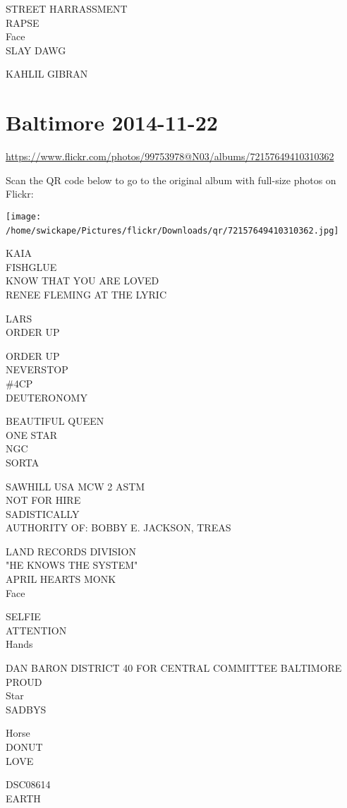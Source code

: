 \documentclass[10pt,letterpaper]{article}
\begin{document}
STREET HARRASSMENT\\
RAPSE\\
Face\\
SLAY DAWG

KAHLIL GIBRAN
\

\section*{Baltimore 2014-11-22}

\url{https://www.flickr.com/photos/99753978@N03/albums/72157649410310362}

Scan the QR code below to go to the original album with full-size photos on Flickr:

\texttt{[image: /home/swickape/Pictures/flickr/Downloads/qr/72157649410310362.jpg]}
\

KAIA\\
FISHGLUE\\
KNOW THAT YOU ARE LOVED\\
RENEE FLEMING AT THE LYRIC

LARS\\
ORDER UP

ORDER UP\\
NEVERSTOP\\
\#4CP\\
DEUTERONOMY

BEAUTIFUL QUEEN\\
ONE STAR\\
NGC\\
SORTA

SAWHILL USA MCW 2 ASTM\\
NOT FOR HIRE\\
SADISTICALLY\\
AUTHORITY OF: BOBBY E. JACKSON, TREAS

LAND RECORDS DIVISION\\
"HE KNOWS THE SYSTEM"\\
APRIL HEARTS MONK\\
Face

SELFIE\\
ATTENTION\\
Hands

DAN BARON DISTRICT 40 FOR CENTRAL COMMITTEE BALTIMORE PROUD\\
Star\\
SADBYS

Horse\\
DONUT\\
LOVE

DSC08614\\
EARTH
\
\end{document}
